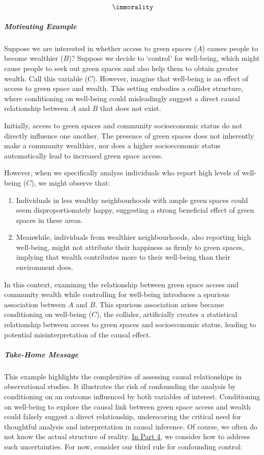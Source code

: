 \documentclass[
  singlecolumn]{article}
\let\oldsubparagraph\subparagraph
\renewcommand{\subparagraph}[1]{\oldsubparagraph{#1}\mbox{}}
\providecommand{\tightlist}{%
  \setlength{\itemsep}{0pt}\setlength{\parskip}{0pt}}\usepackage{longtable,booktabs,array}
\begin{document}
\[\immorality\]

\subparagraph{Motivating Example}\label{motivating-example-2}

Suppose we are interested in whether access to green spaces (\(A\))
causes people to become wealthier (\(B\))? Suppose we decide to
`control' for well-being, which might cause people to seek out green
spaces and also help them to obtain greater wealth. Call this variable
(\(C\)). However, imagine that well-being is an effect of access to
green space and wealth. This setting embodies a collider structure,
where conditioning on well-being could misleadingly suggest a direct
causal relationship between \(A\) and \(B\) that does not exist.

Initially, access to green spaces and community socioeconomic status do
not directly influence one another. The presence of green spaces does
not inherently make a community wealthier, nor does a higher
socioeconomic status automatically lead to increased green space access.

However, when we specifically analyse individuals who report high levels
of well-being (\(\boxed{C}\)), we might observe that:

\begin{enumerate}
\def\labelenumi{\arabic{enumi}.}
\tightlist
\item
  Individuals in less wealthy neighbourhoods with ample green spaces
  could seem disproportionately happy, suggesting a strong beneficial
  effect of green spaces in these areas.
\item
  Meanwhile, individuals from wealthier neighbourhoods, also reporting
  high well-being, might not attribute their happiness as firmly to
  green spaces, implying that wealth contributes more to their
  well-being than their environment does.
\end{enumerate}

In this context, examining the relationship between green space access
and community wealth while controlling for well-being introduces a
spurious association between \(A\) and \(B\). This spurious association
arises because conditioning on well-being (\(C\)), the collider,
artificially creates a statistical relationship between access to green
spaces and socioeconomic status, leading to potential misinterpretation
of the causal effect.

\subparagraph{\texorpdfstring{\textbf{Take-Home
Message}}{Take-Home Message}}\label{take-home-message}

This example highlights the complexities of assessing causal
relationships in observational studies. It illustrates the risk of
confounding the analysis by conditioning on an outcome influenced by
both variables of interest. Conditioning on well-being to explore the
causal link between green space access and wealth could falsely suggest
a direct relationship, underscoring the critical need for thoughtful
analysis and interpretation in causal inference. Of course, we often do
not know the actual structure of reality. \hyperref[sec-part4]{In Part
4}, we consider how to address such uncertainties. For now, consider our
third rule for confounding control:
\end{document}
